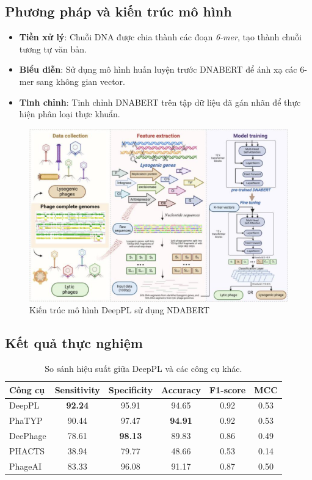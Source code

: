 \subsection*{Phương pháp và kiến trúc mô hình}

\begin{itemize}
    \item \textbf{Tiền xử lý}: Chuỗi DNA được chia thành các đoạn \textit{6-mer}, tạo thành chuỗi tương tự văn bản.
    \item \textbf{Biểu diễn}: Sử dụng mô hình huấn luyện trước DNABERT để ánh xạ các 6-mer sang không gian vector.
    \item \textbf{Tinh chỉnh}: Tinh chỉnh DNABERT trên tập dữ liệu đã gán nhãn để thực hiện phân loại thực khuẩn.
\end{itemize}
\begin{figure}[H]
    \centering
    \includegraphics[width=1\linewidth]{figures/DeepPL_model.png}
    \caption{Kiến trúc mô hình DeepPL sử dụng NDABERT}
    \label{fig:DeepPL_model}
\end{figure}

\subsection*{Kết quả thực nghiệm}

\begin{table}[ht]
\centering
\caption{So sánh hiệu suất giữa DeepPL và các công cụ khác.}
\label{tab:performance_comparison_deeppl}
\begin{tabular}{|l|c|c|c|c|c|}
\hline
\textbf{Công cụ} & \textbf{Sensitivity} & \textbf{Specificity} & \textbf{Accuracy} & \textbf{F1-score} & \textbf{MCC} \\
\hline
DeepPL   & \textbf{92.24}  & 95.91 & 94.65 & 0.92 & 0.53 \\
PhaTYP   & 90.44 & 97.47 & \textbf{94.91} & 0.92 & 0.53 \\
DeePhage & 78.61 & \textbf{98.13} & 89.83 & 0.86 & 0.49 \\
PHACTS   & 38.94 & 79.77 & 48.66 & 0.53 & 0.14 \\
PhageAI  & 83.33 & 96.08 & 91.17 & 0.87 & 0.50 \\
\hline
\end{tabular}
\label{tbl:deeppl}
\end{table}


